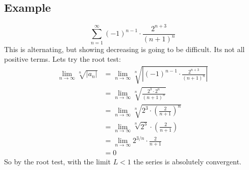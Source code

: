 \documentclass{article}
\begin{document}
    \subsection{Example}
        \[\sum_{n = 1}^{\infty} (-1)^{n-1} \cdot \frac{2^{n+3}}{(n+1)^n}\]
        This is alternating, but showing decreasing is going to be difficult. Its not all positive terms.
        Lets try the root test:
        \begin{align*}
            \lim_{n \to \infty} \sqrt[n]{|a_n|}
            &= \lim_{n \to \infty} \sqrt[n]{\left| (-1)^{n-1} \cdot \frac{2^{n+3}}{(n+1)^n} \right|} \\
            &= \lim_{n \to \infty} \sqrt[n]{\frac{2^3 \cdot 2^n}{(n+1)^n}} \\
            &= \lim_{n \to \infty} \sqrt[n]{2^3 \cdot \left(\frac{2}{n+1}\right)^n } \\
            &= \lim_{n \to \infty} \sqrt[n]{2^3} \cdot \left(\frac{2}{n+1}\right) \\
            &= \lim_{n \to \infty} 2^{3/n} \cdot \frac{2}{n+1} \\
            &= 0
        \end{align*}
        So by the root test, with the limit \(L < 1\) the series is absolutely convergent.
\end{document}
